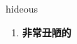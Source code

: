 
\begin{frame}
{\huge hideous}
\begin{center}
\begin{enumerate}\Large
  \item \textbf{非常丑陋的}
\end{enumerate}
\end{center}
\end{frame}
